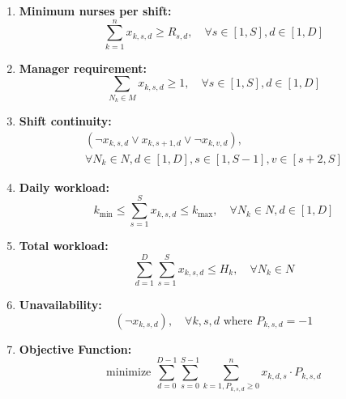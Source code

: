 \documentclass[sigconf, 10pt]{acmart}
\begin{document}
\begin{enumerate}
    \item \textbf{Minimum nurses per shift:}
    \begin{equation}
        \sum_{k=1}^{n} x_{k,s,d} \geq R_{s,d}, \quad \forall s \in [1,S], d \in [1,D]
    \end{equation}

    \item \textbf{Manager requirement:}
    \begin{equation}
        \sum_{N_k \in M} x_{k,s,d} \geq 1, \quad \forall s \in [1,S], d \in [1,D]
    \end{equation}

    \item \textbf{Shift continuity:}
    \begin{equation}
    \begin{gathered}
        ( \neg x_{k,s,d} \lor x_{k,s+1,d} \lor \neg x_{k,v,d} ), \\
        \forall N_k \in N, d \in [1,D], s \in [1,S-1], v \in [s+2,S]
    \end{gathered}
    \end{equation}

    \item \textbf{Daily workload:}
    \begin{equation}
        k_{\min} \leq \sum_{s=1}^{S} x_{k,s,d} \leq k_{\max}, \quad \forall N_k \in N, d \in [1,D]
    \end{equation}

    \item \textbf{Total workload:}
    \begin{equation}
        \sum_{d=1}^{D} \sum_{s=1}^{S} x_{k,s,d} \leq H_k, \quad \forall N_k \in N
    \end{equation}

    \item \textbf{Unavailability:}
    \begin{equation}
        (\neg x_{k,s,d}), \quad \forall k,s,d \text{ where } P_{k,s,d} = -1
    \end{equation}

    \item \textbf{Objective Function:}
    \begin{equation}
        \text{minimize } \sum_{d=0}^{D-1} \sum_{s=0}^{S-1} \sum_{k=1, P_{k,s,d} \ge 0}^{n} x_{k,d,s} \cdot P_{k,s,d}
    \end{equation}
\end{enumerate}
\end{document}
